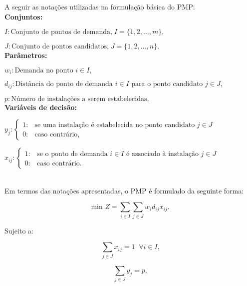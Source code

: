 A seguir as notações utilizadas na formulação básica do PMP: \\

\hline
\textbf{Conjuntos:}

$I \colon \text{Conjunto de pontos de demanda,} \; I = \{1,2,\ldots,m\}\text{,}$

$J \colon \text{Conjunto de pontos candidatos,} \; J = \{1,2,\ldots,n\}\text{.}$ \\

\hline
\textbf{Parâmetros:}

$w_i \colon \text{Demanda no ponto }i \in I\text{,}$

$d_{ij} \colon \text{Distância do ponto de demanda }i \in I \text{ para o ponto candidato }j \in J \text{,}$

$p \colon \text{Número de instalações a serem estabelecidas,}$ \\

\hline
\textbf{Variáveis de decisão:}

$
    y_j \colon
    \begin{cases}
      1: & \text{se uma instalação é estabelecida no ponto candidato }j \in J \\
      0: & \text{caso contrário,}
    \end{cases}
$

$
    x_{ij} \colon
    \begin{cases}
      1: & \text{se o ponto de demanda }i \in I \text{ é associado à instalação }j \in J\\
      0: & \text{caso contrário.}
    \end{cases}
$ \\ \\

\hline

Em termos das notações apresentadas, o PMP é formulado da seguinte forma:

\begin{equation} \label{eq:fund_obj_function}
\text{min }Z = \sum\limits_{i \in I} \sum\limits_{j \in J} w_i d_{ij} x_{ij}.
\end{equation}

Sujeito a:

\begin{equation} \label{eq:fund_constraint1}
\sum\limits_{j \in J} x_{ij} = 1 \;\; \forall i \in I \text{,}
\end{equation}

\begin{equation} \label{eq:fund_constraint2}
\sum\limits_{j \in J} y_{j} = p \text{,}
\end{equation}

